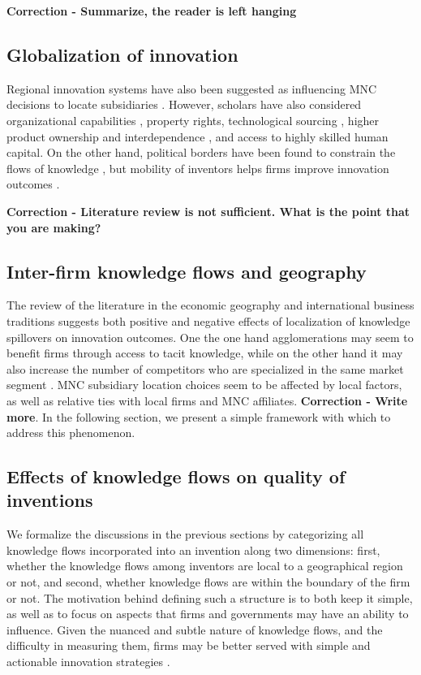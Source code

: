 \documentclass[12pt,letterpaper]{article}
\begin{document}
\textbf{Correction - Summarize, the reader is left hanging}
\subsection{Globalization of innovation}
Regional innovation systems have also been suggested as influencing MNC decisions to locate subsidiaries \citep{Andersen2005}. However, scholars have also considered organizational capabilities \citep{Zhao2006}, property rights, technological sourcing \citep{Florida1997}, higher product ownership and interdependence \citep{Pearce1999}, and access to highly skilled human capital. On the other hand, political borders have been found to constrain the flows of knowledge \citep{Singh2013}, but mobility of inventors helps firms improve innovation outcomes \citep*{Alnuaimi2012b}.

\textbf{Correction - Literature review is not sufficient. What is the point that you are making?}
\subsection{Inter-firm knowledge flows and geography}
The review of the literature in the economic geography and international business traditions suggests both positive and negative effects of localization of knowledge spillovers on innovation outcomes.  One the one hand agglomerations may seem to benefit firms through access to tacit knowledge, while on the other hand it may also increase the number of competitors who are specialized in the same market segment \citep{todo}. MNC subsidiary location choices seem to be affected by local factors, as well as relative ties with local firms and MNC affiliates\citep{todo}. \textbf{Correction - Write more}. In the following section, we present a simple framework with which to address this phenomenon.  

\subsection*{Effects of knowledge flows on quality of inventions}

We formalize the discussions in the previous sections by categorizing all knowledge flows incorporated into an invention along two dimensions:  first, whether the knowledge flows among inventors are local to a geographical region or not, and second, whether knowledge flows are within the boundary of the firm or not. The motivation behind defining such a structure is to both keep it simple, as well as to focus on aspects that firms and governments may have an ability to influence. Given the nuanced and subtle nature of knowledge flows, and the difficulty in measuring them, firms may be better served with simple and actionable innovation strategies \citep{todo}. \par
\end{document}
